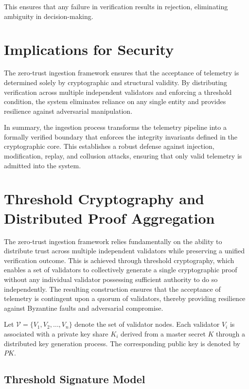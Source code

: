 This ensures that any failure in verification results in rejection, eliminating ambiguity in decision-making.

\section{Implications for Security}

The zero-trust ingestion framework ensures that the acceptance of telemetry is determined solely by cryptographic and structural validity. By distributing verification across multiple independent validators and enforcing a threshold condition, the system eliminates reliance on any single entity and provides resilience against adversarial manipulation.

In summary, the ingestion process transforms the telemetry pipeline into a formally verified boundary that enforces the integrity invariants defined in the cryptographic core. This establishes a robust defense against injection, modification, replay, and collusion attacks, ensuring that only valid telemetry is admitted into the system.

\section{Threshold Cryptography and Distributed Proof Aggregation}

The zero-trust ingestion framework relies fundamentally on the ability to distribute trust across multiple independent validators while preserving a unified verification outcome. This is achieved through threshold cryptography, which enables a set of validators to collectively generate a single cryptographic proof without any individual validator possessing sufficient authority to do so independently. The resulting construction ensures that the acceptance of telemetry is contingent upon a quorum of validators, thereby providing resilience against Byzantine faults and adversarial compromise.

Let $\mathcal{V} = \{V_1, V_2, \dots, V_n\}$ denote the set of validator nodes. Each validator $V_i$ is associated with a private key share $K_i$ derived from a master secret $K$ through a distributed key generation process. The corresponding public key is denoted by $PK$.

\subsection{Threshold Signature Model}

